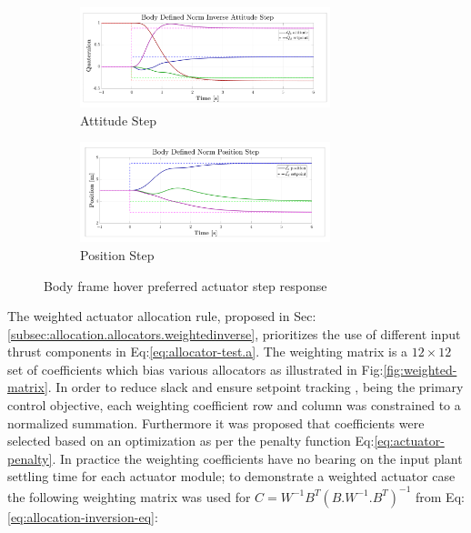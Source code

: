 \par
\begin{figure}[hbtp]
\centering
\begin{subfigure}{\textwidth}
\centering
\includegraphics[width=0.8\textwidth]{graphs/body_norm_attitude}
\vspace{-12pt}
\caption{Attitude Step}
\label{fig:body_norm_attitude}
\end{subfigure}
\begin{subfigure}{\textwidth}
\vspace{-3pt}
\centering
\includegraphics[width=0.8\textwidth]{graphs/body_norm_position}
\vspace{-12pt}
\caption{Position Step}
\label{fig:body_norm_position}
\end{subfigure}
\vspace{-8pt}
\caption{Body frame hover preferred actuator step response}
\label{fig:body-norm-step}
\vspace{-16pt}
\end{figure}
\par
The weighted actuator allocation rule, proposed in Sec:\ref{subsec:allocation.allocators.weightedinverse}, prioritizes the use of different input thrust components in Eq:\ref{eq:allocator-test.a}. The weighting matrix is a $12\times 12$ set of coefficients which bias various allocators as illustrated in Fig:\ref{fig:weighted-matrix}. In order to reduce slack and ensure setpoint tracking , being the primary control objective, each weighting coefficient row and column was constrained to a normalized summation. Furthermore it was proposed that coefficients were selected based on an optimization as per the penalty function Eq:\ref{eq:actuator-penalty}. In practice the weighting coefficients have no bearing on the input plant settling time for each actuator module; to demonstrate a weighted actuator case the following weighting matrix was used for $C=W^{-1}B^T(B.W^{-1}.B^T)^{-1}$ from Eq:\ref{eq:allocation-inversion-eq}:

